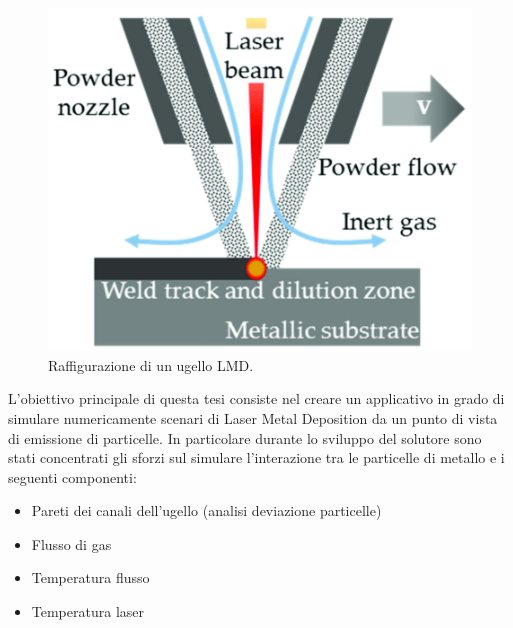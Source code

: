 \begin{figure}[H]
    \centering
    \includegraphics[width=\linewidth]{figure/lmd.png}
    \caption{Raffigurazione di un ugello LMD.}
\end{figure}

L'obiettivo principale di questa tesi consiste nel creare un applicativo in grado di simulare numericamente
scenari di Laser Metal Deposition da un punto di vista di emissione di particelle. In particolare durante lo sviluppo del solutore
sono stati concentrati gli sforzi sul simulare l'interazione tra le particelle di metallo e i seguenti componenti:
\begin{itemize}
    \item Pareti dei canali dell'ugello (analisi deviazione particelle)
    \item Flusso di gas
    \item Temperatura flusso
    \item Temperatura laser
\end{itemize}

